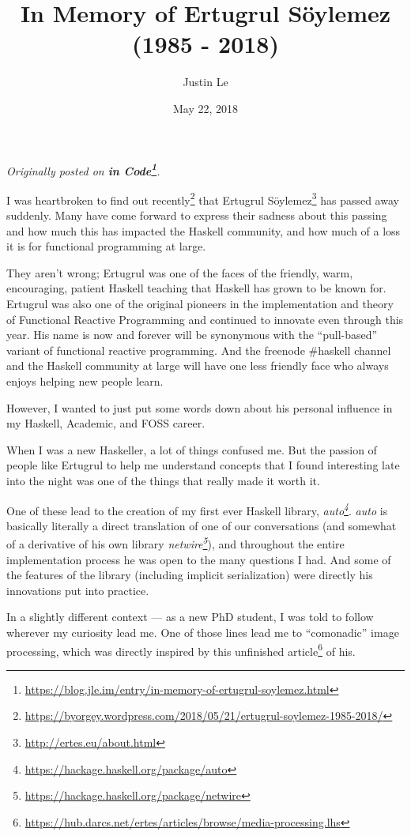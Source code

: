 \documentclass[]{article}
\title{In Memory of Ertugrul Söylemez (1985 - 2018)}
\author{Justin Le}
\date{May 22, 2018}
\renewcommand{\href}[2]{#2\footnote{\url{#1}}}
\begin{document}
\maketitle

\emph{Originally posted on
\textbf{\href{https://blog.jle.im/entry/in-memory-of-ertugrul-soylemez.html}{in
Code}}.}

I was heartbroken to
\href{https://byorgey.wordpress.com/2018/05/21/ertugrul-soylemez-1985-2018/}{find
out recently} that \href{http://ertes.eu/about.html}{Ertugrul Söylemez} has
passed away suddenly. Many have come forward to express their sadness about this
passing and how much this has impacted the Haskell community, and how much of a
loss it is for functional programming at large.

They aren't wrong; Ertugrul was one of the faces of the friendly, warm,
encouraging, patient Haskell teaching that Haskell has grown to be known for.
Ertugrul was also one of the original pioneers in the implementation and theory
of Functional Reactive Programming and continued to innovate even through this
year. His name is now and forever will be synonymous with the ``pull-based''
variant of functional reactive programming. And the freenode \#haskell channel
and the Haskell community at large will have one less friendly face who always
enjoys helping new people learn.

However, I wanted to just put some words down about his personal influence in my
Haskell, Academic, and FOSS career.

When I was a new Haskeller, a lot of things confused me. But the passion of
people like Ertugrul to help me understand concepts that I found interesting
late into the night was one of the things that really made it worth it.

One of these lead to the creation of my first ever Haskell library,
\emph{\href{https://hackage.haskell.org/package/auto}{auto}}. \emph{auto} is
basically literally a direct translation of one of our conversations (and
somewhat of a derivative of his own library
\emph{\href{https://hackage.haskell.org/package/netwire}{netwire}}), and
throughout the entire implementation process he was open to the many questions I
had. And some of the features of the library (including implicit serialization)
were directly his innovations put into practice.

In a slightly different context --- as a new PhD student, I was told to follow
wherever my curiosity lead me. One of those lines lead me to ``comonadic'' image
processing, which was directly inspired by
\href{https://hub.darcs.net/ertes/articles/browse/media-processing.lhs}{this
unfinished article} of his.
\end{document}
